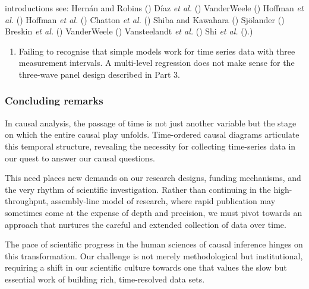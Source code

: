 \documentclass[
  singlecolumn]{article}
\providecommand{\tightlist}{%
  \setlength{\itemsep}{0pt}\setlength{\parskip}{0pt}}\usepackage{longtable,booktabs,array}
\begin{document}
\begin{enumerate}
{    introductions see: Hernán and Robins
    () Díaz \emph{et al.}
    () VanderWeele
    () Hoffman \emph{et al.}
    () Hoffman \emph{et al.}
    () Chatton \emph{et al.}
    () Shiba and Kawahara
    () Sjölander
    () Breskin \emph{et al.}
    () VanderWeele
    () Vansteelandt \emph{et al.}
    () Shi \emph{et al.}
    ().)}
\end{enumerate}

\begin{enumerate}
\def\labelenumi{\arabic{enumi}.}
\setcounter{enumi}{11}
\tightlist
\item
  Failing to recognise that simple models work for time series data with
  three measurement intervals. A multi-level regression does not make
  sense for the three-wave panel design described in Part 3.
\end{enumerate}

\subsubsection{Concluding remarks}\label{concluding-remarks}

In causal analysis, the passage of time is not just another variable but
the stage on which the entire causal play unfolds. Time-ordered causal
diagrams articulate this temporal structure, revealing the necessity for
collecting time-series data in our quest to answer our causal questions.

This need places new demands on our research designs, funding
mechanisms, and the very rhythm of scientific investigation. Rather than
continuing in the high-throughput, assembly-line model of research,
where rapid publication may sometimes come at the expense of depth and
precision, we must pivot towards an approach that nurtures the careful
and extended collection of data over time.

The pace of scientific progress in the human sciences of causal
inference hinges on this transformation. Our challenge is not merely
methodological but institutional, requiring a shift in our scientific
culture towards one that values the slow but essential work of building
rich, time-resolved data sets.
\end{document}
